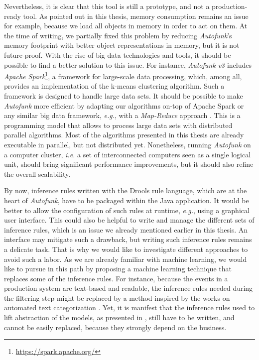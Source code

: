 Nevertheless, it is clear that this tool is still a prototype,
and not a production-ready tool. As pointed out in this thesis,
memory consumption remains an issue for example, because we load
all objects in memory in order to act on them. At the time of
writing, we partially fixed this problem by reducing
\emph{Autofunk}'s memory footprint with better object
representations in memory, but it is not future-proof.
With the rise of big data technologies and tools, it should be
possible to find a better solution to this issue. For instance,
\emph{Autofunk v3} includes \emph{Apache
Spark}\footnote{\url{https://spark.apache.org/}}, a framework for
large-scale data processing, which, among all, provides an
implementation of the k-means clustering algorithm.  Such a
framework is designed to handle large data sets. It should be
possible to make \emph{Autofunk} more efficient by adapting our
algorithms on-top of Apache Spark or any similar big data
framework, \emph{e.g.}, with a \emph{Map-Reduce} approach
\cite{dean2008mapreduce}. This is a programming model that allows
to process large data sets with distributed parallel algorithms.
Most of the algorithms presented in this thesis are already
executable in parallel, but not distributed yet. Nonetheless,
running \emph{Autofunk} on a computer cluster, \emph{i.e.} a set
of interconnected computers seen as a single logical unit, should
bring significant performance improvements, but it should also
refine the overall scalability.

By now, inference rules written with the Drools rule language,
which are at the heart of \emph{Autofunk}, have to be packaged
within the Java application. It would be better to allow the
configuration of such rules at runtime, \emph{e.g.}, using a
graphical user interface. This could also be helpful to write and
manage the different sets of inference rules, which is an issue
we already mentioned earlier in this thesis. An interface may
mitigate such a drawback, but writing such inference rules
remains a delicate task. That is why we would like to investigate
different approaches to avoid such a labor. As we are already
familiar with machine learning, we would like to pursue in this
path by proposing a machine learning technique that replaces some
of the inference rules. For instance, because the events in a
production system are text-based and readable, the inference
rules needed during the filtering step might be replaced by a
method inspired by the works on automated text categorization
\cite{Sebastiani:2002:MLA:505282.505283}. Yet, it is manifest
that the inference rules used to lift abstraction of the models,
as presented in
, still
have to be written, and cannot be easily replaced, because they
strongly depend on the business.

